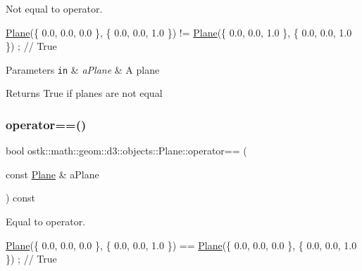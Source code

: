 Not equal to operator. 


\begin{DoxyCode}
\hyperlink{classostk_1_1math_1_1geom_1_1d3_1_1objects_1_1_plane_ac66c2a3b3d9d7cd1fd507123091bb38f}{Plane}(\{ 0.0, 0.0, 0.0 \}, \{ 0.0, 0.0, 1.0 \}) != \hyperlink{classostk_1_1math_1_1geom_1_1d3_1_1objects_1_1_plane_ac66c2a3b3d9d7cd1fd507123091bb38f}{Plane}(\{ 0.0, 0.0, 1.0 \}, \{ 0.0, 0.0, 1.0 \}) ; \textcolor{comment}{//
       True}
\end{DoxyCode}



\begin{DoxyParams}[1]{Parameters}
\mbox{\tt in}  & {\em a\+Plane} & A plane \\
\hline
\end{DoxyParams}
\begin{DoxyReturn}{Returns}
True if planes are not equal 
\end{DoxyReturn}
\mbox{\label{classostk_1_1math_1_1geom_1_1d3_1_1objects_1_1_plane_a93ba2703f5a835cb55e577d649b462f9}} 
\subsubsection{\texorpdfstring{operator==()}{operator==()}}
{\footnotesize\ttfamily bool ostk\+::math\+::geom\+::d3\+::objects\+::\+Plane\+::operator== (\begin{DoxyParamCaption}\item[{const \hyperlink{classostk_1_1math_1_1geom_1_1d3_1_1objects_1_1_plane}{Plane} \&}]{a\+Plane }\end{DoxyParamCaption}) const}



Equal to operator. 


\begin{DoxyCode}
\hyperlink{classostk_1_1math_1_1geom_1_1d3_1_1objects_1_1_plane_ac66c2a3b3d9d7cd1fd507123091bb38f}{Plane}(\{ 0.0, 0.0, 0.0 \}, \{ 0.0, 0.0, 1.0 \}) == \hyperlink{classostk_1_1math_1_1geom_1_1d3_1_1objects_1_1_plane_ac66c2a3b3d9d7cd1fd507123091bb38f}{Plane}(\{ 0.0, 0.0, 0.0 \}, \{ 0.0, 0.0, 1.0 \}) ; \textcolor{comment}{//
       True}
\end{DoxyCode}



